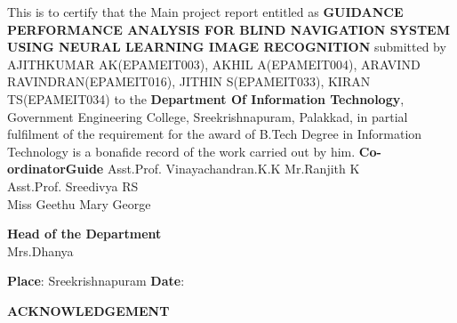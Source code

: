 \documentclass[11pt,a4paper,twoside]{report}
\begin{document}
 This is to certify  that  the  Main project  report entitled  as  {\bf GUIDANCE PERFORMANCE ANALYSIS FOR BLIND NAVIGATION SYSTEM USING NEURAL LEARNING IMAGE RECOGNITION }  submitted by AJITHKUMAR AK(EPAMEIT003), AKHIL A(EPAMEIT004), ARAVIND RAVINDRAN(EPAMEIT016), JITHIN S(EPAMEIT033), KIRAN TS(EPAMEIT034) to the {\bf Department   Of   Information Technology}, Government Engineering College, Sreekrishnapuram, Palakkad, in partial fulfilment of the requirement for the award of B.Tech Degree in Information Technology is a bonafide record of the work carried out by him.
\newline
\newline
\textbf{Co-ordinator}\hspace{9.9cm}\textbf{Guide}
\newline
Asst.Prof. Vinayachandran.K.K \hspace{6.2cm}Mr.Ranjith K
\\
Asst.Prof. Sreedivya RS\\
Miss Geethu Mary George 
\newline
\\
 \begin{center}
 \textbf{Head of the Department}
 \\
Mrs.Dhanya 
\end{center}

\begin{flushleft}

{\bf Place}: Sreekrishnapuram
\newline 
{\bf Date}:\hspace{.1cm}
\end{flushleft}


\newpage
{}
\setcounter{page}{0}
\begin{center}
\begin{Large}
\textbf{ACKNOWLEDGEMENT}
\end{Large}
\end{center}
\end{document}
